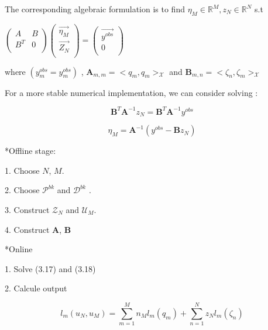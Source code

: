 \documentclass[a4paper,10pt]{beamer}
\numberwithin{equation}{section}
\begin{document}
\begin{frame}
The corresponding algebraic formulation is to find $\eta_M \in \mathbb{R}^M, z_N \in \mathbb{R}^N$ s.t\\

\begin{center}
	$
	\begin{pmatrix}
	A&B\\ 
	B^{T}&0\\  
	\end{pmatrix} 
	\begin{pmatrix}
	\overrightarrow{\eta_{M}}\\ 
	\overrightarrow{Z_{N}}\\ 
	\end{pmatrix} =\begin{pmatrix}
	\overrightarrow{y^{obs}}\\ 
	0\\ 
	\end{pmatrix} 
	$
\end{center}


where $(y^{obs}_m = y^{obs}_m)$ , $\textbf{A}_{m,m} = <q_m,q_m>_{\mathcal{X}}$ and $\textbf{B}_{m,n} = <\zeta_n, \zeta_m>_{\mathcal{X}}$ 

For a more stable numerical implementation, we can consider solving :

\begin{equation}
\textbf{B}^T \textbf{A}^{-1} z_N = \textbf{B}^T \textbf{A}^{-1} y^{obs}
\end{equation}

\begin{equation}
\eta_M = \textbf{A}^{-1} (y^{obs}  - \textbf{B} z_N)
\end{equation}

\end{frame}


\begin{frame}
*Offline stage:

1. Choose $N$, $M$.

2. Choose $\mathcal{P}^{bk}$ and $\mathcal{D}^{bk}$ .

3. Construct $\mathcal{Z}_N$ and $\mathcal{U}_M$.

4. Construct $\textbf{A}$, $\textbf{B}$

*Online

1. Solve (3.17) and (3.18)

2. Calcule output

\begin{equation}
l_m(u_N,u_M) = \sum^{M}_{m=1} n_M l_m(q_m) + \sum^{N}_{n=1} z_N l_m(\zeta_n)
\end{equation}

\end{frame}
\end{document}
